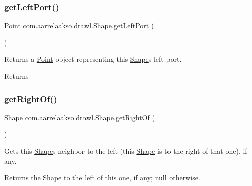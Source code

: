\subsubsection{\texorpdfstring{get\+Left\+Port()}{getLeftPort()}}
{\footnotesize\ttfamily \hyperlink{classcom_1_1aarrelaakso_1_1drawl_1_1_point}{Point} com.\+aarrelaakso.\+drawl.\+Shape.\+get\+Left\+Port (\begin{DoxyParamCaption}{ }\end{DoxyParamCaption})\hspace{0.3cm}{\ttfamily [inherited]}}



Returns a \hyperlink{classcom_1_1aarrelaakso_1_1drawl_1_1_point}{Point} object representing this \hyperlink{classcom_1_1aarrelaakso_1_1drawl_1_1_shape}{Shape}\textquotesingle{}s left port. 

\begin{DoxyReturn}{Returns}

\end{DoxyReturn}
\mbox{\label{classcom_1_1aarrelaakso_1_1drawl_1_1_shape_a1ad573b06f341aa79f6a255a476ae6e4}} 
\subsubsection{\texorpdfstring{get\+Right\+Of()}{getRightOf()}}
{\footnotesize\ttfamily \hyperlink{classcom_1_1aarrelaakso_1_1drawl_1_1_shape}{Shape} com.\+aarrelaakso.\+drawl.\+Shape.\+get\+Right\+Of (\begin{DoxyParamCaption}{ }\end{DoxyParamCaption})\hspace{0.3cm}{\ttfamily [inherited]}}



Gets this \hyperlink{classcom_1_1aarrelaakso_1_1drawl_1_1_shape}{Shape}\textquotesingle{}s neighbor to the left (this \hyperlink{classcom_1_1aarrelaakso_1_1drawl_1_1_shape}{Shape} is to the right of that one), if any. 

\begin{DoxyReturn}{Returns}
the \hyperlink{classcom_1_1aarrelaakso_1_1drawl_1_1_shape}{Shape} to the left of this one, if any; {\ttfamily null} otherwise. 
\end{DoxyReturn}
\mbox{\label{classcom_1_1aarrelaakso_1_1drawl_1_1_shape_a319c78d425ec91e1aef1072a95e349ad}} 
